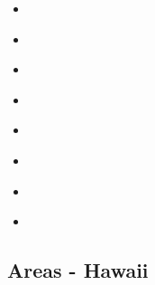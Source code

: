 \begin{scriptsize}
\begin{itemize}
\item[\nineteenninetyfour]
\textcite{gikb94} \\
\item[\nineteenninetynine]
\textcite{pymi99} \\
\item[\twothousandeleven]
\textcite{vabt11} \\
\item[\twothousandtwelve]
\textcite{busm12} \\
\item[\twothousandfourteen]
\textcite{gagb14} \\
\item[\twothousandseventeen]
\textcite{wakc17} \\
\item[\twothousandeighteen]
\textcite{gusb18} \\
\item[\twothousandtwenty]
\textcite{cels20} \\
\end{itemize}
\end{scriptsize}

\subsection{Areas - Hawaii}

